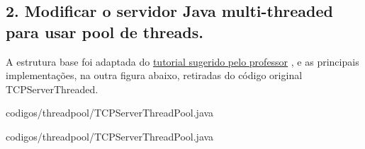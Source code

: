 \pagebreak

\subsection*{2. Modificar o servidor Java multi-threaded para usar pool de threads.}

A estrutura base foi adaptada do \hyperlink{http://tutorials.jenkov.com/java-concurrency/thread-pools.html}{tutorial sugerido pelo professor}
, e as principais implementações, na outra figura abaixo, retiradas do código original TCPServerThreaded.

\vspace{-0.5em}
\begin{minipage}{\textwidth}
  \hspace{-1em}
  \centering
   {codigos/threadpool/TCPServerThreadPool.java}
  \label{prog1}
  \hspace{1em}
\end{minipage}
\vspace{0.5em}

\vspace{-0.5em}
\begin{minipage}{\textwidth}
  \hspace{-1em}
  \centering
   {codigos/threadpool/TCPServerThreadPool.java}
  \label{prog1}
  \hspace{1em}
\end{minipage}
\vspace{0.5em}

